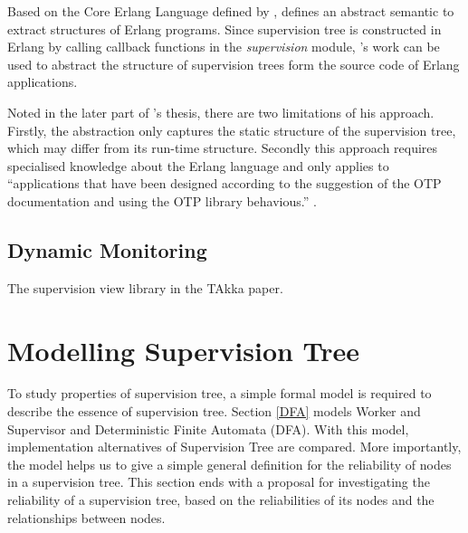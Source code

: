\documentclass[12pt, authoryear]{article}
\begin{document}
Based on the Core Erlang Language defined by \citep{CoreErlang}, 
\citep{JanHenry} defines an abstract semantic to extract structures of Erlang 
programs.  Since supervision tree is constructed in Erlang by calling callback 
functions in the {\it supervision} module, \citeauthor{JanHenry}'s work can 
be used to abstract the structure of supervision trees form the source code of 
Erlang applications.

Noted in the later part of \citeauthor{JanHenry}'s thesis, there are two 
limitations of his approach.  Firstly, the abstraction only captures the static 
structure of the supervision tree, which may differ from its run-time 
structure.  Secondly this approach requires specialised knowledge about the 
Erlang language and only applies to ``applications that have been 
designed according to the suggestion of the OTP documentation and using the OTP 
library behavious.'' \citep{JanHenry}.



\subsection{Dynamic Monitoring}\label{Dynamic}

The supervision view library in the TAkka paper.




\section{Modelling Supervision Tree}\label{model}


To study properties of supervision tree, a simple formal model is required to 
describe the essence of supervision tree.  Section \ref{DFA}
models Worker and Supervisor and Deterministic Finite Automata (DFA).  With 
this model, implementation alternatives of Supervision Tree are compared.  More 
importantly, the model helps us to give a simple general definition for the 
reliability of nodes in a supervision tree.  This section ends with a proposal 
for investigating the reliability of a supervision tree, based on the 
reliabilities of its nodes and the relationships between nodes.
\end{document}
